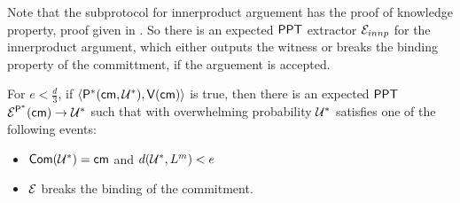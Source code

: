 Note that the subprotocol for innerproduct arguement has the proof of knowledge property, proof given in \cite{Bulletproofs}. So there is an expected $\mathsf{PPT}$ extractor $\mathcal{E}_{innp}$ for the innerproduct argument, which either outputs the witness or breaks the binding property of the committment, if the arguement is accepted.
\begin{theorem}\label{theo:proximity}
	For $e < \frac{d}{3} $, if $\langle \mathsf{P}^*(\mathsf{cm}, \mathcal{U}^*),\mathsf{V}(\mathsf{cm})\rangle $ is true, then there is an expected $\mathsf{PPT}$ $\mathcal{E}^{\mathsf{P}^*}(\mathsf{cm}) \rightarrow \mathcal{U}^*$ such that with overwhelming probability $\mathcal{U}^*$ satisfies one of the following events: 
	\begin{itemize}
		\item $\mathsf{Com}(\mathcal{U}^*) = \mathsf{cm}$ and $ d(\mathcal{U}^*, L^m) < e$
		\item $\mathcal{E}$ breaks the binding of the commitment. 
	\end{itemize} 
	
\end{theorem}


